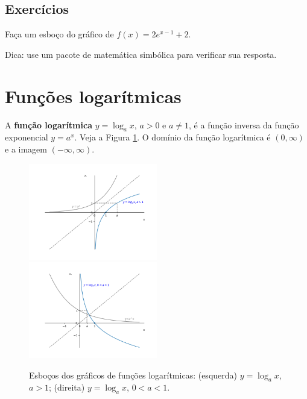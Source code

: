 \subsection*{Exercícios}

\begin{exer}
  Faça um esboço do gráfico de $f(x) = 2e^{x-1}+2$.
\end{exer}
\begin{resp}
  Dica: use um pacote de matemática simbólica para verificar sua resposta.
\end{resp}

\section{Funções logarítmicas}\label{cap_funcao_sec_funlog}

A {\bf função logarítmica} $y = \log_a x$, $a>0$ e $a\neq 1$, é a função inversa da função exponencial $y = a^x$. Veja a Figura \ref{fig:log_graficos}. O domínio da função logarítmica é $(0,\infty)$ e a imagem $(-\infty, \infty)$.

\begin{figure}[H]
  \centering
  \includegraphics[width=0.5\textwidth]{./cap_funcao/dados/fig_log_graficos/fig_log_2}~
  \includegraphics[width=0.5\textwidth]{./cap_funcao/dados/fig_log_graficos/fig_log_12}
  \caption{Esboços dos gráficos de funções logarítmicas: (esquerda) $y = \log_a x$, $a>1$; (direita) $y = \log_a x$, $0<a<1$.}
  \label{fig:log_graficos}
\end{figure}


